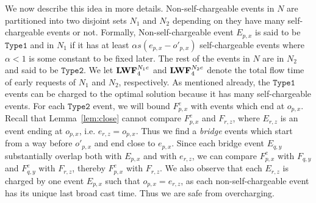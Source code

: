 \documentclass[11pt]{article}
\newcommand{\one}{\texttt{Type1}}
\newcommand{\two}{\texttt{Type2}}
\newcommand{\fe}{F^e}
\begin{document}
\begin{titlepage}
We now describe this idea in more details. Non-self-chargeable events in $N$ are partitioned into two disjoint sets
$N_1$ and $N_2$ depending on they have many self-chargeable events or not. Formally, Non-self-chargeable event
$E_{p,x}$ is said to be $\one$ and in $N_1$ if it has at least $\alpha s (e_{p,x}- o'_{p,x})$ self-chargeable events
where $\alpha <1$ is some constant to be fixed later. The rest of the events in $N$ are in $N_2$ and said to be $\two$.
We let ${\texttt{\bf{LWF}}}^{N_1e}_4$ and ${\texttt{\bf{LWF}}}^{N_2e}_4$ denote the total flow time of early requests of $N_1$ and $N_2$, respectively.
As mentioned already, the $\one$ events can be charged to the optimal solution because it has many self-chargeable
events. For each $\two$ event, we will bound $\fe_{p,x}$ with events which end at $o_{p,x}$. Recall that
Lemma~\ref{lem:close} cannot compare $\fe_{p,x}$ and $F_{r,z}$, where $E_{r,z}$ is an event ending at $o_{p,x}$, i.e.
$e_{r,z} = o_{p,x}$. Thus we find a \emph{bridge} events which start from a way before $o'_{p,x}$ and end close to
$e_{p,x}$. Since each bridge event $E_{q,y}$ substantially overlap both with $E_{p,x}$ and with $e_{r,z}$, we can
compare $\fe_{p,x}$ with $F_{q,y}$ and $\fe_{q,y}$ with $F_{r,z}$, thereby $\fe_{p,x}$ with $F_{r,z}$. We also observe
that each $E_{r,z}$ is charged by one event $E_{p,x}$ such that $o_{p,x} = e_{r,z}$, as each non-self-chargeable event
has its unique last broad cast time. Thus we are safe from overcharging.

\iffalse In this section, we show how all the events ending during $[o'_{p,x}, e_{p,x}-1]$ can be used to pay for
$\fe_{p,x}$. To do this, non-self-chargeable events in $N$ are partitioned into two disjoint sets $N_1$ and
$N_2$. For simplicity, event $E_{p,x}$ is said to have $E_{q,y}$ if $E_{q,y}$ ends during $[o'_{p,x}, e_{p,x}-1]$.
Non-self-chargeable event $E_{p,x}$ is said to be $\one$ and in $N_1$ if it has at least $\alpha s(e_{p,x} - o'_{p,x})$
self-chargeable events where $\alpha <1$ is some constant to be fixed later. The rest of the events in $N$ are in $N_2$
and said to be $\two$.  The $\one$ events can be charged to the optimal solution because it has many self-chargeable
events. For each $\two$ event, we will bound $\fe_{p,x}$ with events which end at $o_{p,x}$. Recall that
Lemma~\ref{lem:close} cannot compare $\fe_{p,x}$ and $F_{r,z}$, where $e_{r,z} = o'_{p,x}$. Thus we find a
\emph{bridge} events $E_{q,y}$, and compare $\fe_{p,x}$ with $F_{q,y}$ and $\fe_{q,y}$ with $F_{r,z}$, thereby
$\fe_{p,x}$ with $F_{r,z}$. \fi









\end{titlepage}
\end{document}
